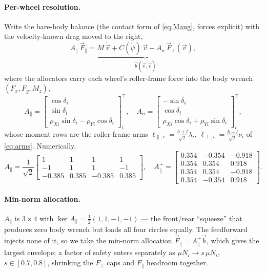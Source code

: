 \documentclass[11pt]{article}
\begin{document}
\paragraph{Per-wheel resolution.} Write the bare-body balance (the contact form of \eqref{eq:Maug},
forces explicit) with the velocity-known drag moved to the right,
\begin{equation}
A_\parallel\,\vec F_\parallel=\underbrace{M\,\dot{\vec v}+C(\dot\psi)\,\vec v-A_n\,\vec F_\perp(\vec v)}_{\textstyle\vec b(\vec v,\dot{\vec v})},
\label{eq:alloc}
\end{equation}
where the allocators carry each wheel's roller-frame force into the body wrench $(F_x,F_y,M_z)$,
\begin{equation}
A_\parallel=\begin{bmatrix}\cos\delta_i\\[1pt]\sin\delta_i\\[1pt]\rho_{Xi}\sin\delta_i-\rho_{Yi}\cos\delta_i\end{bmatrix}^{\!\top}_{\!\!i},\quad
A_n=\begin{bmatrix}-\sin\delta_i\\[1pt]\cos\delta_i\\[1pt]\rho_{Xi}\cos\delta_i+\rho_{Yi}\sin\delta_i\end{bmatrix}^{\!\top}_{\!\!i},
\end{equation}
whose moment rows are the roller-frame arms $\ell_{\parallel,i}=\tfrac{h+l}{\sqrt2}\lambda_i$,
$\ell_{\perp,i}=\tfrac{h-l}{\sqrt2}\nu_i$ of \eqref{eq:arms}. Numerically,
\begin{equation}
A_\parallel=\frac{1}{\sqrt2}\!\begin{bmatrix}1&1&1&1\\-1&1&1&-1\\-0.385&0.385&-0.385&0.385\end{bmatrix},\quad
A_\parallel^{+}=\begin{bmatrix}0.354&-0.354&-0.918\\0.354&0.354&0.918\\0.354&0.354&-0.918\\0.354&-0.354&0.918\end{bmatrix}.
\end{equation}

\paragraph{Min-norm allocation.} $A_\parallel$ is $3\times4$ with
$\ker A_\parallel=\tfrac12(1,1,-1,-1)$ --- the front/rear ``squeeze'' that produces zero body
wrench but loads all four circles equally. The feedforward injects none of it, so we take the
min-norm allocation $\vec F_\parallel=A_\parallel^{+}\vec b$, which gives the largest envelope; a
factor of safety enters separately as $\mu N_i\to s\,\mu N_i$, $s\in[0.7,0.8]$, shrinking the
$F_\perp$ caps and $F_\parallel$ headroom together.
\end{document}
